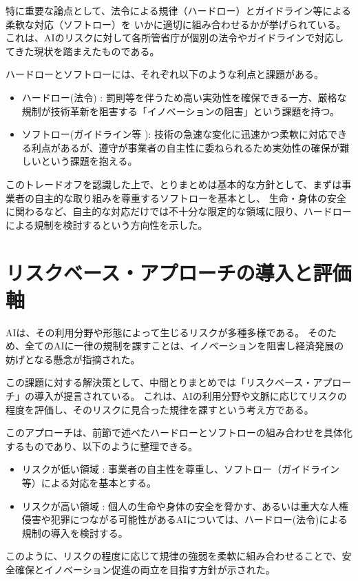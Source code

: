 特に重要な論点として、法令による規律（ハードロー）とガイドライン等による柔軟な対応（ソフトロー）を
いかに適切に組み合わせるかが挙げられている。
これは、AIのリスクに対して各所管省庁が個別の法令やガイドラインで対応してきた現状を踏まえたものである。

ハードローとソフトローには、それぞれ以下のような利点と課題がある。

\begin{itemize}
    \item ハードロー(法令) : 罰則等を伴うため高い実効性を確保できる一方、厳格な規制が技術革新を阻害する「イノベーションの阻害」という課題を持つ。
    \item ソフトロー(ガイドライン等 ): 技術の急速な変化に迅速かつ柔軟に対応できる利点があるが、遵守が事業者の自主性に委ねられるため実効性の確保が難しいという課題を抱える。
\end{itemize}

このトレードオフを認識した上で、とりまとめは基本的な方針として、まずは事業者の自主的な取り組みを尊重するソフトローを基本とし、
生命・身体の安全に関わるなど、自主的な対応だけでは不十分な限定的な領域に限り、ハードローによる規制を検討するという方向性を示した。


\section{リスクベース・アプローチの導入と評価軸}
AIは、その利用分野や形態によって生じるリスクが多種多様である。
そのため、全てのAIに一律の規制を課すことは、イノベーションを阻害し経済発展の妨げとなる懸念が指摘された。

この課題に対する解決策として、中間とりまとめでは「リスクベース・アプローチ」の導入が提言されている。
これは、AIの利用分野や文脈に応じてリスクの程度を評価し、そのリスクに見合った規律を課すという考え方である。

このアプローチは、前節で述べたハードローとソフトローの組み合わせを具体化するものであり、以下のように整理できる。

\begin{itemize}
    \item リスクが低い領域 : 事業者の自主性を尊重し、ソフトロー（ガイドライン等）による対応を基本とする。
    \item リスクが高い領域 : 個人の生命や身体の安全を脅かす、あるいは重大な人権侵害や犯罪につながる可能性があるAIについては、ハードロー(法令)による規制の導入を検討する。
\end{itemize}

このように、リスクの程度に応じて規律の強弱を柔軟に組み合わせることで、安全確保とイノベーション促進の両立を目指す方針が示された。
